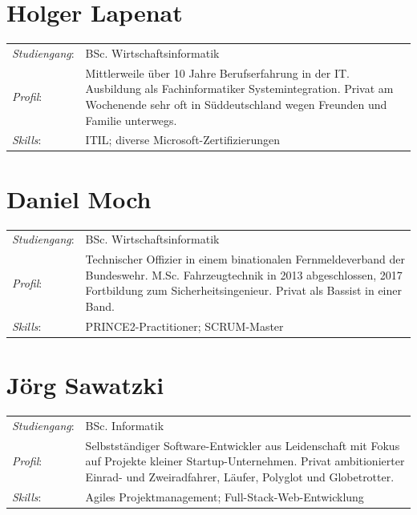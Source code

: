 \documentclass[a4paper,11pt,listof=numbered,glossary=totoc,parskip=half]{scrreprt}
\begin{document}
\section{Holger Lapenat}

\begin{tabularx}{\linewidth}{lX}
\toprule
\textit{Studiengang}: & BSc. Wirtschaftsinformatik\\
\textit{Profil}: & Mittlerweile über 10 Jahre Berufserfahrung in der IT. Ausbildung als Fachinformatiker Systemintegration. Privat am Wochenende sehr oft in Süddeutschland wegen Freunden und Familie unterwegs.
 \\
\textit{Skills}: & ITIL; diverse Microsoft-Zertifizierungen \\
\bottomrule
\end{tabularx}

\section{Daniel Moch}

\begin{tabularx}{\linewidth}{lX}
\toprule
\textit{Studiengang}: & BSc. Wirtschaftsinformatik\\
\textit{Profil}: & Technischer Offizier in einem binationalen Fernmeldeverband der Bundeswehr. M.Sc. Fahrzeugtechnik in 2013 abgeschlossen, 2017 Fortbildung zum Sicherheitsingenieur. Privat als Bassist in einer Band.
 \\
\textit{Skills}: & PRINCE2-Practitioner; SCRUM-Master \\
\bottomrule
\end{tabularx}

\section{Jörg Sawatzki}

\begin{tabularx}{\linewidth}{lX}
\toprule
\textit{Studiengang}: & BSc. Informatik\\
\textit{Profil}: & Selbstständiger Software-Entwickler aus Leidenschaft mit Fokus auf Projekte kleiner Startup-Unternehmen.  Privat ambitionierter Einrad- und Zweiradfahrer, Läufer, Polyglot und Globetrotter. 
 \\
\textit{Skills}: & Agiles Projektmanagement; Full-Stack-Web-Entwicklung \\
\bottomrule
\end{tabularx}
\newpage
\end{document}

